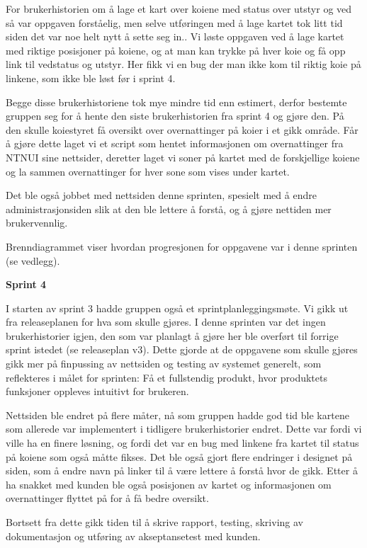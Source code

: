 \documentclass[12pt,a4paper,norsk]{article}
\begin{document}
For brukerhistorien om å lage et kart over koiene med status over utstyr og ved så var oppgaven forståelig, men selve utføringen med å lage kartet tok litt tid siden det var noe helt nytt å sette seg in.. Vi løste oppgaven ved å lage kartet med riktige posisjoner på koiene, og at man kan trykke på hver koie og få opp link til vedstatus og utstyr. Her fikk vi en bug der man ikke kom til riktig koie på linkene, som ikke ble løst før i sprint 4.   

Begge disse brukerhistoriene tok mye mindre tid enn estimert, derfor bestemte gruppen seg for å hente den siste brukerhistorien fra sprint 4 og gjøre den. På den skulle koiestyret få oversikt over overnattinger på koier i et gikk område. Får å gjøre dette laget vi et script som hentet informasjonen om overnattinger fra NTNUI sine nettsider, deretter laget vi soner på kartet med de forskjellige koiene og la sammen overnattinger for hver sone som vises under kartet. 

Det ble også jobbet med nettsiden denne sprinten, spesielt med å endre administrasjonsiden slik at den ble lettere å forstå, og å gjøre nettiden mer brukervennlig.  

Brenndiagrammet viser hvordan progresjonen for oppgavene var i denne sprinten (se vedlegg).

\bigskip \noindent \textbf{Sprint 4}
\par I starten av sprint 3 hadde gruppen også et sprintplanleggingsmøte. Vi gikk ut fra releaseplanen for hva som skulle gjøres. I denne sprinten var det ingen brukerhistorier igjen, den som var planlagt å gjøre her ble overført til forrige sprint istedet (se releaseplan v3). Dette gjorde at de oppgavene som skulle gjøres gikk mer på finpussing av nettsiden og testing av systemet generelt, som reflekteres i målet for sprinten: Få et fullstendig produkt, hvor produktets funksjoner oppleves intuitivt for brukeren.

Nettsiden ble endret på flere måter, nå som gruppen hadde god tid ble kartene som allerede var implementert i tidligere brukerhistorier endret. Dette var fordi vi ville ha en finere løsning, og fordi det var en bug med linkene fra kartet til status på koiene som også måtte fikses. Det ble også gjort flere endringer i designet på siden, som å endre navn på linker til å være lettere å forstå hvor de gikk. Etter å ha snakket med kunden ble også posisjonen av kartet og informasjonen om overnattinger flyttet på for å få bedre oversikt. 

Bortsett fra dette gikk tiden til å skrive rapport, testing, skriving av dokumentasjon og utføring av akseptansetest med kunden. 
\end{document}
